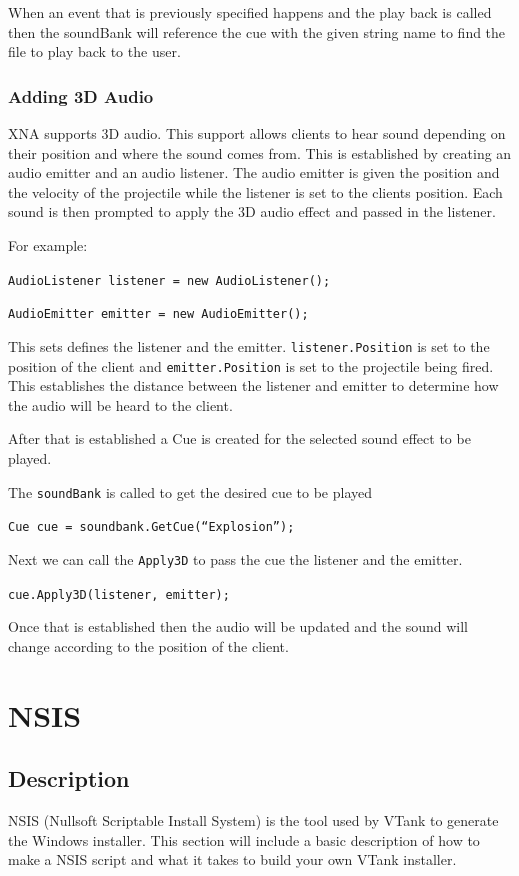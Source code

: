 When an event that is  previously specified happens and the play back is called then the soundBank will reference the cue with the given string name to find the file to play back to the user.

\subsubsection{Adding 3D Audio}

XNA supports 3D audio. This support allows clients to hear sound depending on their position and where the sound comes from. This is established by creating an audio emitter and an audio listener. The audio emitter is given the position and the velocity of the projectile while the listener is set to the clients position. Each sound is then prompted to apply the 3D audio effect and passed in the listener.

For example:

\texttt{AudioListener listener = new AudioListener();}

\texttt{AudioEmitter emitter = new AudioEmitter();}

This sets defines the listener and the emitter. \texttt{listener.Position} is set to the position of the client and \texttt{emitter.Position} is set to the projectile being fired. This establishes the distance between the listener and emitter to determine how the audio will be heard to the client.

After that is established a Cue is created for the selected sound effect to be played.

The \texttt{soundBank} is called to get the desired cue to be played

\texttt{Cue cue = soundbank.GetCue(``Explosion'');}

Next we can call the \texttt{Apply3D} to pass the cue the listener and the emitter.

\texttt{cue.Apply3D(listener, emitter);} 

Once that is established then the audio will be updated and the sound will change according to the position of the client.


\section{NSIS}

\subsection{Description}
NSIS (Nullsoft Scriptable Install System)\cite{nsis} is the tool used by VTank to generate the Windows installer. This section will include a basic description of how to make a NSIS script and what it takes to build your own VTank installer. 

